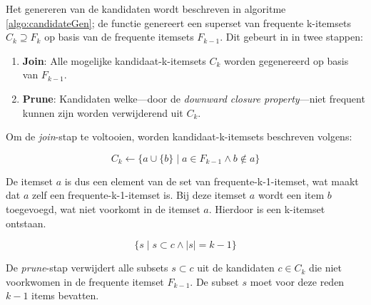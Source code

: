 Het genereren van de kandidaten wordt beschreven in algoritme \ref{algo:candidateGen}; de functie genereert een superset van frequente k-itemsets $ C_k \supseteq F_k$ op basis van de frequente itemsets $F_{k-1}$. Dit gebeurt in in twee stappen:

\begin{enumerate}
\item \textbf{Join}: Alle mogelijke kandidaat-k-itemsets $C_k$ worden gegenereerd op basis van $F_{k-1}$.
\item \textbf{Prune}: Kandidaten welke---door de \emph{downward closure property}---niet frequent kunnen zijn worden verwijderend uit $C_k$.
\end{enumerate}

Om de \emph{join}-stap te voltooien, worden kandidaat-k-itemsets beschreven volgens:

\begin{equation}
C_k \gets \{a \cup \{b\} \mid a \in F_{k-1} \wedge b \notin a \}
\end{equation}

De itemset $a$ is dus een element van de set van frequente-k-1-itemset, wat maakt dat $a$ zelf een frequente-k-1-itemset is. Bij deze itemset $a$ wordt een item $b$ toegevoegd, wat niet voorkomt in de itemset $a$. Hierdoor is een k-itemset ontstaan.

\begin{equation}
\{s \mid s \subset c \wedge |s| = k - 1\}
\end{equation}

De \emph{prune}-stap verwijdert alle subsets $s \subset c$ uit de kandidaten $c \in C_k$ die niet voorkwomen in de frequente itemset $F_{k-1}$. De subset $s$ moet voor deze reden $k-1$ items bevatten.

